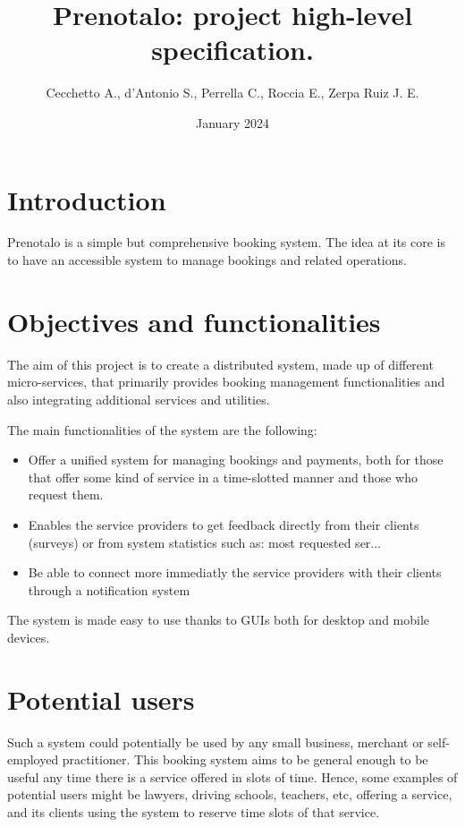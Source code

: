 \documentclass{article}
\title{Prenotalo: project high-level specification.}
\author{Cecchetto A., d'Antonio S., Perrella C., Roccia E., Zerpa Ruiz J. E.}
\date{January 2024}
\begin{document}
\maketitle


\section{Introduction}
Prenotalo is a simple but comprehensive booking system. The idea at its core is
to have an accessible system to manage bookings and related operations.

\section{Objectives and functionalities}
The aim of this project is to create a distributed system, made up of different
micro-services, that primarily provides booking management functionalities
and also integrating additional services and utilities. 


The main functionalities of the system are the following: 
\begin{itemize}
	\item Offer a unified system for managing bookings and payments,
		both for those that offer some kind of service in a time-slotted
		manner and those who request them.
	\item Enables the service providers to get feedback directly from their
		clients (surveys) or from system statistics such as: most requested ser...
	\item Be able to connect more immediatly the service providers with their
		clients through a notification system
\end{itemize}
The system is made easy to use thanks to GUIs both for desktop and mobile
devices.

\section{Potential users}
Such a system could potentially be used by any small business, merchant or
self-employed practitioner. This booking system aims to be general enough to be
useful any time there is a service offered in slots of time. Hence, some 
examples of potential users might be lawyers, driving schools, teachers, etc,
offering a service, and its clients using the system to reserve time slots of
that service.
\end{document}
